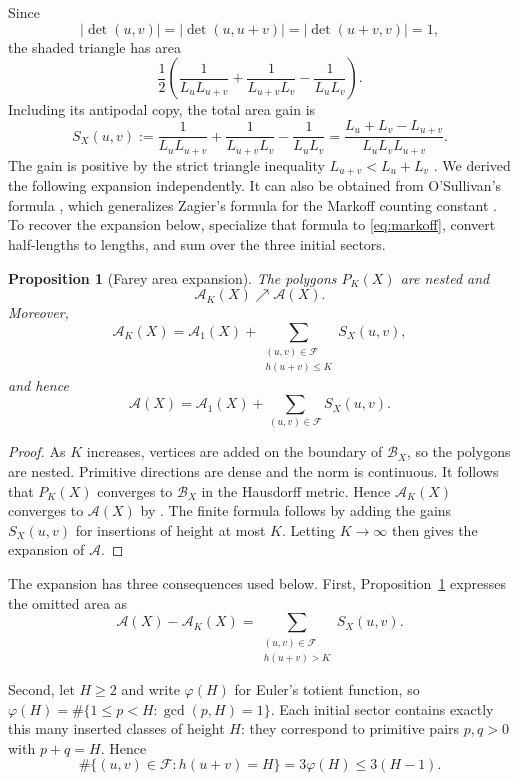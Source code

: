 \documentclass[10pt,twoside]{article}
\theoremstyle{plain}
\newtheorem{proposition}[theorem]{Proposition}
\theoremstyle{definition}
\theoremstyle{remark}
\newcommand{\A}{\mathcal A}
\newcommand{\B}{\mathcal B}
\begin{document}
Since
$$
|\det(u,v)|=|\det(u,u+v)|=|\det(u+v,v)|=1,
$$
the shaded triangle has area
$$
\frac12\left(
\frac1{L_uL_{u+v}}
+\frac1{L_{u+v}L_v}
-\frac1{L_uL_v}
\right).
$$
Including its antipodal copy, the total area gain is
\begin{equation}
\label{eq:area-gain}
S_X(u,v)
:=
\frac1{L_uL_{u+v}}
+\frac1{L_{u+v}L_v}
-\frac1{L_uL_v}
=
\frac{L_u+L_v-L_{u+v}}{L_uL_vL_{u+v}}.
\end{equation}
The gain is positive by the strict triangle inequality
$L_{u+v}<L_u+L_v$ \cite[Section~2]{McShaneRivinTori}.
We derived the following expansion independently. It can also be
obtained from O'Sullivan's formula
\cite[Proposition~6.5]{OSullivan2026}, which generalizes
Zagier's formula for the Markoff counting constant
\cite[equation~(3)]{Zagier1982}.
To recover the expansion below, specialize that formula to
\eqref{eq:markoff}, convert half-lengths to lengths, and sum over
the three initial sectors.

\begin{proposition}[Farey area expansion]
\label{prop:farey-expansion}
The polygons $P_K(X)$ are nested and
$$
\A_K(X)\nearrow\A(X).
$$
Moreover,
$$
\A_K(X)
=
\A_1(X)
+
\sum_{\substack{(u,v)\in\mathscr F\\h(u+v)\leq K}}
S_X(u,v),
$$
and hence
$$
\A(X)
=
\A_1(X)
+
\sum_{(u,v)\in\mathscr F}S_X(u,v).
$$
\end{proposition}

\begin{proof}
As $K$ increases, vertices are added on the boundary of $\B_X$, so
the polygons are nested. Primitive directions are dense and the norm
is continuous. It follows that
$P_K(X)$ converges to $\B_X$ in the Hausdorff metric. Hence
$
\A_K(X)$ converges to $\A(X)
$
by \cite[Theorem~1.8.20]{Schneider}.
The finite formula follows by adding the gains $S_X(u,v)$ for
insertions of height at most $K$. Letting $K\to\infty$ then gives
the expansion of $\A$.
\end{proof}

The expansion has three consequences used below. First,
Proposition~\ref{prop:farey-expansion} expresses the omitted area as
\begin{equation}
\label{eq:farey-tail}
\A(X)-\A_K(X)
=
\sum_{\substack{(u,v)\in\mathscr F\\h(u+v)>K}}
S_X(u,v).
\end{equation}

Second, let $H\geq2$ and write $\varphi(H)$ for Euler's totient
function, so $\varphi(H)=\#\{1\leq p<H:\gcd(p,H)=1\}$.
Each initial sector contains exactly this many inserted classes of
height $H$: they correspond to primitive pairs $p,q>0$ with
$p+q=H$. Hence
\begin{equation}
\label{eq:farey-height-count}
\#\{(u,v)\in\mathscr F:h(u+v)=H\}
=3\varphi(H)\leq3(H-1).
\end{equation}
\end{document}
